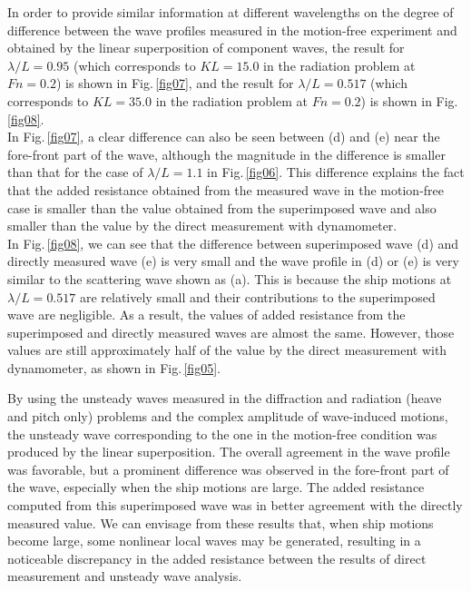 \documentclass[11pt,fleqn,a3]{article}
\begin{document}
In order to provide similar information at different wavelengths on the degree 
of difference between the wave profiles measured in the motion-free 
experiment and obtained by the linear superposition of component waves, 
the result for $\lambda /L =0.95$ (which corresponds to $KL=15.0$ in 
the radiation problem at $Fn=0.2$) 
is shown in Fig.\,\ref{fig07}, and the result for $\lambda /L =0.517$ 
(which corresponds to $KL=35.0$ in the radiation problem 
at $Fn=0.2$) is shown in Fig.\,\ref{fig08}.
\\

In Fig.\,\ref{fig07}, a clear difference can also be seen between 
(d) and (e) near the fore-front part of the wave, although the magnitude 
in the difference is smaller than that for the case of 
$\lambda /L =1.1$ in Fig.\,\ref{fig06}.
This difference explains the fact that the added resistance obtained 
from the measured wave in the motion-free case is smaller than the 
value obtained from the superimposed wave and also smaller than the value by the 
direct measurement with dynamometer.
\\

In Fig.\,\ref{fig08}, we can see that the difference between 
superimposed wave (d) and directly measured wave (e) 
is very small and the wave profile in (d) or (e) is very similar 
to the scattering wave shown as (a).
This is because the ship motions at $\lambda /L=0.517$ are 
relatively small and their contributions to the superimposed wave 
are negligible.
As a result, the values of added resistance from the superimposed 
and directly measured waves are almost the same.
However, those values are still approximately half of the value 
by the direct measurement with dynamometer, as shown in Fig.\,\ref{fig05}.


\medskip%
%
By using the unsteady waves measured in the diffraction 
and radiation (heave and pitch only) problems and the complex amplitude 
of wave-induced motions, the unsteady wave corresponding to the one in  
the motion-free condition was produced by the linear superposition.
The overall agreement in the wave profile was favorable, but a prominent difference 
was observed in the fore-front part of the wave, especially when the 
ship motions are large. The added resistance computed from this superimposed 
wave was in better agreement with the directly measured value.
We can envisage from these results that, when ship motions become large, some 
nonlinear local waves may be generated, resulting in a noticeable discrepancy 
in the added resistance between the results of direct measurement and unsteady 
wave analysis.
\end{document}
